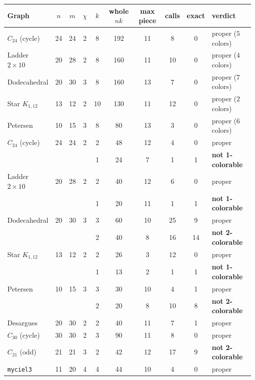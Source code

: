 \documentclass[a4paper,fleqn]{cas-sc}
\begin{document}
\begin{table}[tb]
\centering
\small
\setlength{\tabcolsep}{4.5pt}
\begin{tabular}{@{}lccccccccl@{}}
\toprule
Graph & $n$ & $m$ & $\chi$ & $k$ & whole $nk$ & max piece & calls & exact & verdict \\
\midrule
$C_{24}$ (cycle)      & 24 & 24 & 2 & 8  & 192 & 11 & 8  & 0  & proper ($5$ colors) \\
Ladder $2{\times}10$  & 20 & 28 & 2 & 8  & 160 & 11 & 10 & 0  & proper ($4$ colors) \\
Dodecahedral          & 20 & 30 & 3 & 8  & 160 & 13 & 7  & 0  & proper ($7$ colors) \\
Star $K_{1,12}$       & 13 & 12 & 2 & 10 & 130 & 11 & 12 & 0  & proper ($2$ colors) \\
Petersen              & 10 & 15 & 3 & 8  & 80  & 13 & 3  & 0  & proper ($6$ colors) \\
\midrule
$C_{24}$ (cycle)      & 24 & 24 & 2 & 2  & 48  & 12 & 4  & 0  & proper \\
                      &    &    &   & 1  & 24  & 7  & 1  & 1  & \textbf{not 1-colorable} \\
Ladder $2{\times}10$  & 20 & 28 & 2 & 2  & 40  & 12 & 6  & 0  & proper \\
                      &    &    &   & 1  & 20  & 11 & 1  & 1  & \textbf{not 1-colorable} \\
Dodecahedral          & 20 & 30 & 3 & 3  & 60  & 10 & 25 & 9  & proper \\
                      &    &    &   & 2  & 40  & 8  & 16 & 14 & \textbf{not 2-colorable} \\
Star $K_{1,12}$       & 13 & 12 & 2 & 2  & 26  & 3  & 12 & 0  & proper \\
                      &    &    &   & 1  & 13  & 2  & 1  & 1  & \textbf{not 1-colorable} \\
Petersen              & 10 & 15 & 3 & 3  & 30  & 10 & 4  & 1  & proper \\
                      &    &    &   & 2  & 20  & 8  & 10 & 8  & \textbf{not 2-colorable} \\
\midrule
Desargues             & 20 & 30 & 2 & 2  & 40  & 11 & 7  & 1  & proper \\
$C_{30}$ (cycle)      & 30 & 30 & 2 & 3  & 90  & 11 & 8  & 0  & proper \\
$C_{21}$ (odd)        & 21 & 21 & 3 & 2  & 42  & 12 & 17 & 9  & \textbf{not 2-colorable} \\
\midrule
\texttt{myciel3}      & 11 & 20 & 4 & 4  & 44  & 10 & 4   & 0  & proper \\

\end{tabular}
\end{table}
\end{document}
